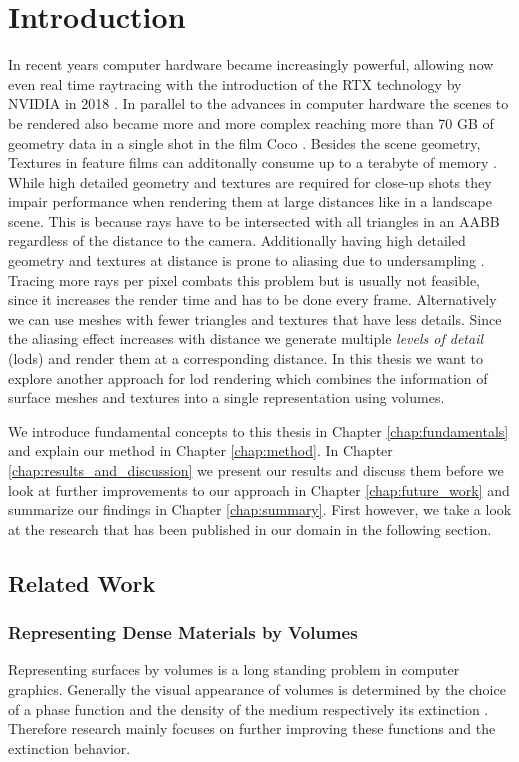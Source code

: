 \chapter{Introduction}
\label{chap:intro}

In recent years computer hardware became increasingly powerful, allowing now even real time raytracing with the introduction of the RTX technology by NVIDIA in 2018 \cite{turing_whitepaper}.
In parallel to the advances in computer hardware the scenes to be rendered also became more and more complex reaching more than 70 GB of geometry data in a single shot in the film Coco \cite{pixarxpu}.
Besides the scene geometry, Textures in feature films can additonally consume up to a terabyte of memory \cite{arnold}.
While high detailed geometry and textures are required for close-up shots they impair performance when rendering them at large distances like in a landscape scene.
This is because rays have to be intersected with all triangles in an AABB regardless of the distance to the camera.
Additionally having high detailed geometry and textures at distance is prone to aliasing due to undersampling \cite{pbr}.
Tracing more rays per pixel combats this problem but is usually not feasible, since it increases the render time and has to be done every frame.
Alternatively we can use meshes with fewer triangles and textures that have less details.
Since the aliasing effect increases with distance we generate multiple \textit{levels of detail} (\acsp{lod}) and render them at a corresponding distance.
In this thesis we want to explore another approach for \acl{lod} rendering which combines the information of surface meshes and textures into a single representation using volumes.

We introduce fundamental concepts to this thesis in Chapter \ref{chap:fundamentals} and explain our method in Chapter \ref{chap:method}.
In Chapter \ref{chap:results_and_discussion} we present our results and discuss them before we look at further improvements to our approach in Chapter \ref{chap:future_work} and summarize our findings in Chapter \ref{chap:summary}.
First however, we take a look at the research that has been published in our domain in the following section.

\section{Related Work}
\subsection{Representing Dense Materials by Volumes}
Representing surfaces by volumes is a long standing problem in computer graphics.
Generally the visual appearance of volumes is determined by the choice of a phase function and the density of the medium respectively its extinction \cite{pbr}.
Therefore research mainly focuses on further improving these functions and the extinction behavior.

